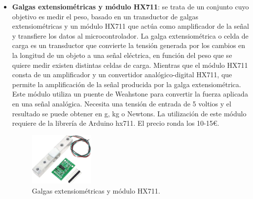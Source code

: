 \begin{itemize}
    
    \item \textbf{Galgas extensiométricas y módulo HX711}\cite{GyHX711_1,GyHX711_2}: se trata de un conjunto cuyo objetivo es medir el peso, basado en un transductor de galgas extensiométricas y un módulo HX711 que actúa como amplificador de la señal y transfiere los datos al microcontrolador. La galga extensiométrica o celda de carga es un transductor que convierte la tensión generada por los cambios en la longitud de un objeto a una señal eléctrica, en función del peso que se quiere medir existen distintas celdas de carga. Mientras que el módulo HX711 consta de un amplificador y un convertidor analógico-digital HX711, que permite la amplificación de la señal producida por la galga extensiométrica. Este módulo utiliza un puente de Weahstone para convertir la fuerza aplicada en una señal analógica. Necesita una tensión de entrada de 5 voltios y el resultado se puede obtener en g, kg o Newtons. La utilización de este módulo requiere de la librería de Arduino hx711. El precio ronda los 10-15€.
\begin{figure}[h!]
    \centering
    \includegraphics[width=0.3\textwidth]{img/GyHX711.jpg}
    \caption{Galgas extensiométricas y módulo HX711\cite{imgGyHX711}.}
    \label{fig:HX711} %
\end{figure}


\end{itemize}
